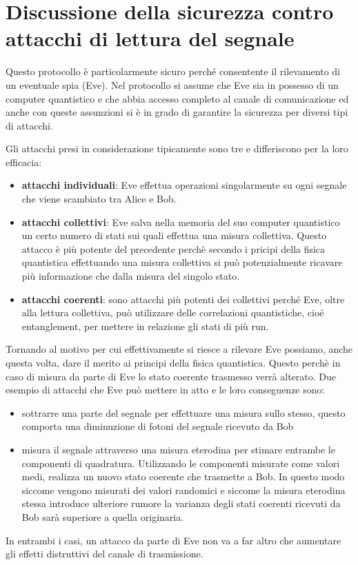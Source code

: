 \section{Discussione della sicurezza contro attacchi di lettura del segnale}
Questo protocollo \`e particolarmente sicuro perch\'e consentente il rilevamento di un eventuale spia (Eve). Nel protocollo si assume che Eve sia in possesso di un computer quantistico e che abbia accesso completo al canale di comunicazione ed anche con queste assunzioni si \`e in grado di garantire la sicurezza per diversi tipi di attacchi.

Gli attacchi presi in considerazione tipicamente sono tre e differiscono per la loro efficacia:
\begin{itemize}
\item \textbf{attacchi individuali}: Eve effettua operazioni singolarmente su ogni segnale che viene scambiato tra Alice e Bob. 
\item \textbf{attacchi collettivi}: Eve salva nella memoria del suo computer quantistico un certo numero di stati sui quali effettua una misura collettiva. Questo attacco \`e pi\`u potente del precedente perch\`e secondo i pricipi della fisica quantistica effettuando una misura collettiva si pu\`o potenzialmente ricavare pi\`u informazione che dalla misura del singolo stato. 
\item \textbf{attacchi coerenti}: sono attacchi pi\`u potenti dei collettivi perché Eve, oltre alla lettura collettiva, può utilizzare delle correlazioni quantistiche, cioé entanglement, per mettere in relazione gli stati di pi\`u run.
\end{itemize} 

Tornando al motivo per cui effettivamente si riesce a rilevare Eve possiamo, anche questa volta, dare il merito ai principi della fisica quantistica. Questo perch\`e in caso di misura da parte di Eve lo stato coerente trasmesso verr\`a alterato. Due esempio di attacchi che Eve pu\`o mettere in atto e le loro conseguenze sono: 
\begin{itemize}
\item sottrarre una parte del segnale per effettuare una misura sullo stesso, questo comporta una diminuzione di fotoni del segnale ricevuto da Bob
\item misura il segnale attraverso una misura eterodina per stimare entrambe le componenti di quadratura. Utilizzando le componenti misurate come valori medi, realizza un nuovo stato coerente che trasmette a Bob. In questo modo siccome vengono misurati dei valori randomici e siccome la misura eterodina stessa introduce ulteriore rumore la varianza degli stati coerenti ricevuti da Bob sar\`a superiore a quella originaria. 
\end{itemize} 
In entrambi i casi, un attacco da parte di Eve non va a far altro che aumentare gli effetti distruttivi del canale di trasmissione.


